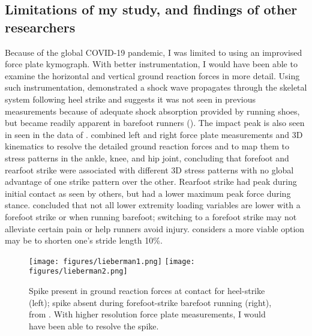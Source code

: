 \subsection{Limitations of my study, and findings of other researchers}
Because of the global COVID-19 pandemic, I was limited to using an improvised force plate kymograph.  With better instrumentation, I would have been able to examine the horizontal and vertical ground reaction forces in more detail. Using such instrumentation, \citet{dickinson1985measurement} demonstrated a shock wave propagates through the skeletal system following heel strike and suggests it was not seen in previous measurements because of adequate shock absorption provided by running shoes, but became readily apparent in barefoot runners (). The impact peak is also seen in seen in the data of \citep{chan1994foot, boyer2015rearfoot, lieberman2010foot}. \citet{knorz2017three} combined left and right force plate measurements and 3D kinematics to resolve the detailed ground reaction forces and to map them to stress patterns in the ankle, knee, and hip joint, concluding that forefoot and rearfoot strike were associated with different 3D stress patterns with no global advantage of one strike pattern over the other. Rearfoot strike had peak during initial contact as seen by others, but had a lower maximum peak force during stance. \citet{boyer2015rearfoot} concluded that not all lower extremity loading variables are lower with a forefoot strike or when running barefoot; switching to a forefoot strike may not alleviate certain pain or help runners avoid injury. \citet{boyer2015rearfoot} considers a more viable option may be to shorten one’s stride length 10\%.
\begin{figure}
\begin{center}
\texttt{[image: figures/lieberman1.png]}
\texttt{[image: figures/lieberman2.png]}
\end{center}
\caption{Spike present in ground reaction forces at contact for heel-strike (left); spike absent during forefoot-strike barefoot running (right), from \citep{lieberman2010foot}. With higher resolution force plate measurements, I would have been able to resolve the spike.}
\label{fig:discussion}
\end{figure}

